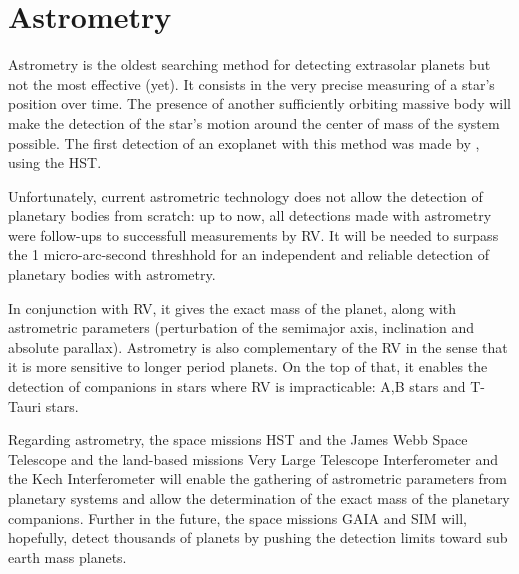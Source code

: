 \documentclass[dvips,12pt,a4paper]{report}
\begin{document}
\section{Astrometry}
\label{astrometry}
Astrometry is the oldest searching method for detecting extrasolar planets but not the most effective (yet). It consists in the very precise measuring of a star's position over time. The presence of another sufficiently orbiting massive body will make the detection of the star's motion around the center of mass of the system possible. The first detection of an exoplanet with this method was made by \citet{Benedict-2002}, using the HST. 

Unfortunately, current astrometric technology does not allow the detection of planetary bodies from scratch: up to now, all detections made with astrometry were follow-ups to successfull measurements by RV. It will be needed to surpass the 1 micro-arc-second threshhold for an independent and reliable detection of planetary bodies with astrometry.

In conjunction with RV, it gives the exact mass of the planet, along with astrometric parameters (perturbation of the semimajor axis, inclination and absolute parallax). Astrometry is also complementary of the RV in the sense that it is more sensitive to longer period planets. On the top of that, it enables the detection of companions in stars where RV is impracticable: A,B stars and T-Tauri stars.

Regarding astrometry, the space missions HST and the James Webb Space Telescope and the land-based missions Very Large Telescope Interferometer and the Kech Interferometer will enable the gathering of astrometric parameters from planetary systems and allow the determination of the exact mass of the planetary companions. Further in the future, the space missions GAIA and SIM will, hopefully, detect thousands of planets by pushing the detection limits toward sub earth mass planets.
\end{document}
